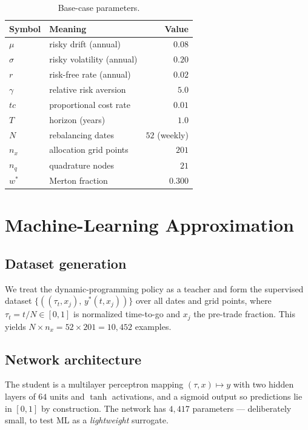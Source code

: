 \documentclass[11pt]{article}
\begin{document}
\begin{table}[t]
\centering
\caption{Base-case parameters.}
\label{tab:params}
\begin{tabular}{llr}
\toprule
Symbol & Meaning & Value\\
\midrule
$\mu$ & risky drift (annual) & $0.08$\\
$\sigma$ & risky volatility (annual) & $0.20$\\
$r$ & risk-free rate (annual) & $0.02$\\
$\gamma$ & relative risk aversion & $5.0$\\
$tc$ & proportional cost rate & $0.01$\\
$T$ & horizon (years) & $1.0$\\
$N$ & rebalancing dates & $52$ (weekly)\\
$n_x$ & allocation grid points & $201$\\
$n_q$ & quadrature nodes & $21$\\
$w^{*}$ & Merton fraction & $0.300$\\
\bottomrule
\end{tabular}
\end{table}

\section{Machine-Learning Approximation}
\label{sec:ml}

\subsection{Dataset generation}
We treat the dynamic-programming policy as a teacher and form the supervised
dataset $\{((\tau_t,x_j),\,y^{*}(t,x_j))\}$ over all dates and grid points, where
$\tau_t=t/N\in[0,1]$ is normalized time-to-go and $x_j$ the pre-trade fraction.
This yields $N\times n_x=52\times201=10{,}452$ examples.

\subsection{Network architecture}
The student is a multilayer perceptron mapping $(\tau,x)\mapsto y$ with two
hidden layers of $64$ units and $\tanh$ activations, and a sigmoid output so
predictions lie in $[0,1]$ by construction. The network has $4{,}417$
parameters --- deliberately small, to test ML as a \emph{lightweight} surrogate.
\end{document}
